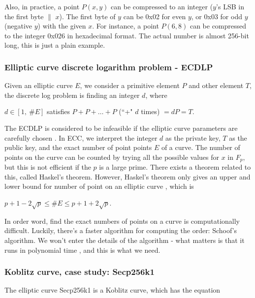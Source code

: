 Also, in practice, a point $P(x,y)$ can be compressed to an integer ($y$’s LSB in the first byte $\|$  $x$). The first byte of $y$ can be 0x02 for even $y$, or 0x03 for odd $y$ (negative $y$) with the given $x$. For instance, a point $P(6, 8)$ can be compressed to the integer 0x026 in hexadecimal format. The actual number is almost 256-bit long, this is just a plain example.

\subsubsection{Elliptic curve discrete logarithm problem - ECDLP}

Given an elliptic curve $E$, we consider a primitive element $P$ and other element $T$, the discrete log problem is finding an integer $d$, where
\begin{center}

$d \in [1, \ \#E]$ satisfies $P + P + \dotso + P$ (``+" $d$ times) $= dP = T$.
\end{center}

The ECDLP is considered to be infeasible if the elliptic curve parameters are carefully chosen \cite{DBLP:journals/iacr/BosCLN14}. In ECC, we interpret the integer $d$ as the private key, $T$ as the public key, and the exact number of point points $E$ of a curve. The number of points on the curve can be counted by trying all the possible values for $x$ in $F_p$, but this is not efficient if the $p$ is a large prime. There exists a theorem related to this, called Haskel’s theorem. However, Haskel’s theorem only gives an upper and lower bound for number of point on an elliptic curve \cite{DBLP:journals/iacr/BosCLN14}, which is

\begin{center}
  $p+1-2\sqrt{p} \leq \#E \leq p+1+2\sqrt{p}$.
\end{center}

In order word, find the exact numbers of points on a curve is computationally difficult. Luckily, there's a faster algorithm for computing the order: Schoof's algorithm. We won't enter the details of the algorithm - what matters is that it runs in polynomial time \cite{Schoof}, and this is what we need.

\subsubsection{Koblitz curve, case study: Secp256k1}
The elliptic curve Secp256k1 is a Koblitz curve, which has the equation


